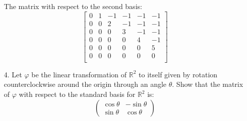 \documentclass[10pt]{article}
\newcommand{\R}{\mathbb{R}}
\renewcommand{\phi}{\varphi}
\begin{document}
\begin{itemize}
The matrix with respect to the second basis:
\begin{equation*} 
\left[
\begin{matrix}
0 & 1 & -1& -1& -1& -1\\
0 & 0 & 2 & -1& -1& -1\\
0 & 0 & 0 & 3 & -1& -1\\
0 & 0 & 0 & 0 & 4 & -1\\
0 & 0 & 0 & 0 & 0 & 5 \\
0 & 0 & 0 & 0 & 0 & 0 \\
\end{matrix}
\right]
\end{equation*}


\item [4.] Let $\phi$ be the linear transformation of $\R^{2}$ to itself
given by rotation counterclockwise around the origin through an angle
$\theta$. Show that the matrix of $\phi$ with respect to the standard
basis for $\R^{2}$ is:\[
\left(\begin{matrix}\cos\theta & -\sin\theta\\
\sin\theta & \cos\theta\end{matrix}\right)\]



\end{itemize}
\end{document}
